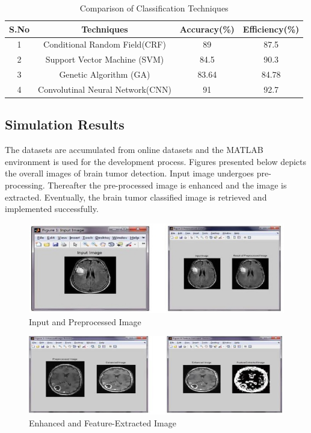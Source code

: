 \documentclass[a4paper, 12pt]{report}
\begin{document}
\begin{spacing}{1.5}
\begin{table}[h!]
	\centering
	\begin{tabular}{||c|c|c|c||}
		\hline
		S.No & Techniques & Accuracy(\%) & Efficiency(\%)\\
		[0.5ex]
		\hline \hline
		1 & Conditional Random Field(CRF) & 89 & 87.5 \\
		2 & Support Vector Machine (SVM) & 84.5 & 90.3 \\
		3 & Genetic Algorithm (GA) & 83.64 & 84.78 \\
		4 & Convolutinal Neural Network(CNN) & 91 & 92.7\\ [1ex]
		\hline
	\end{tabular}
	\caption{Comparison of Classification Techniques}
	\label{table:1}
\end{table}
\subsection{Simulation Results}

\par The datasets are accumulated from online datasets and the MATLAB environment is used for the development process. Figures presented below depicts the overall images of brain tumor detection. Input image undergoes pre-processing. Thereafter the pre-processed image is enhanced and the image is extracted. Eventually, the brain tumor classified image is retrieved and implemented successfully.
\newpage
\begin{figure}[h]
\centering
\includegraphics[width=0.7\linewidth]{./ippre}
\caption{Input and Preprocessed Image}
\end{figure}

\begin{figure}[h]
	\centering
	\includegraphics[width=0.7\linewidth]{./efe}
	\caption{Enhanced and Feature-Extracted Image}
\end{figure}


\end{spacing}
\end{document}
